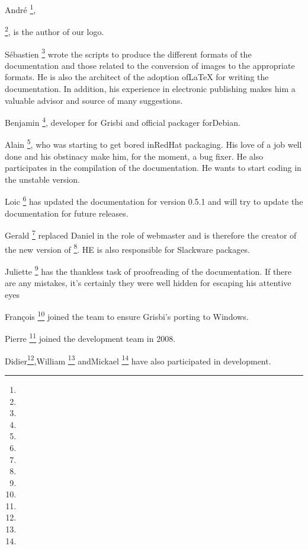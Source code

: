 {André } \footnote{ \urlAndrePascualEmail{}},

 \footnote{ \urlLinuxGraphic{}}, is the author of our logo.

{Sébastien } \footnote{ \urlSebastienBlondeelEmail{}} wrote the scripts to produce the different formats of the documentation and those related to the conversion of images to the appropriate formats. He is also the architect of the adoption of\gls{LaTeX} for writing the documentation. In addition, his experience in electronic publishing makes him a valuable advisor and source of many suggestions.

{Benjamin } \footnote{ \urlBenjaminDrieuEmail{}}, developer for Grisbi and official packager for\gls{Debian}.

{Alain } \footnote{ \urlDionysosEmail{}}, who was starting to get bored in\gls{RedHat} packaging. His love of a job well done and his obstinacy make him, for the moment, a bug fixer. He also participates in the compilation of the documentation. He wants to start coding in the unstable version.

{Loic  \footnote{ \urlLoicBreillouxEmail{}}} has updated the documentation for version 0.5.1 and will try to update the documentation for future releases.

{Gerald } \footnote{\urlGeraldNielEmail{}} replaced {Daniel } in the role of webmaster and is therefore the creator of the new version of  \footnote{\urlGrisbi{}}. HE is also responsible for \gls{Slackware} packages.

{Juliette } \footnote{\urlJulietteEmail{}} has the thankless task of proofreading of the documentation. If there are any mistakes, it's certainly they were well hidden for escaping his attentive eyes

{François } \footnote{ \urlFrancoisTerrotEmail{}} joined the team to ensure Grisbi's \gls{porting} to Windows.

{Pierre } \footnote{ \urlPierreBiavaEmail{}} joined the development team in 2008.

{Didier}\footnote{\urlDidierChevalierEmail{}},{William } \footnote{ \urlWilliamOllivierEmail{}} and{Mickael } \footnote{ \urlMickaelRemarsEmail{}} have also participated in development.

